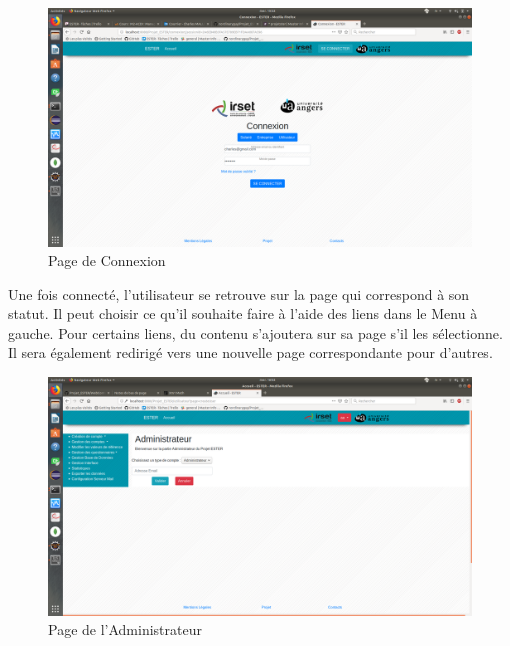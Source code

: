 \begin{figure}[ht]
    \begin{center}
	\includegraphics[scale=0.2,trim=4cm 0cm 4cm 5.3cm, clip=true]{img/Connexion}
    \end{center}
    \caption{Page de Connexion}
\end{figure}

Une fois connecté, l'utilisateur se retrouve sur la page qui correspond à son statut. Il peut choisir ce qu'il souhaite faire à l'aide des liens dans le Menu à gauche. Pour certains liens, du contenu s'ajoutera sur sa page s'il les sélectionne. Il sera également redirigé vers une nouvelle page correspondante pour d'autres. 

\begin{figure}[ht]
    \begin{center}
	\includegraphics[scale=0.2,trim=2.8cm 0.1cm 0.8cm 5.3cm, clip=true]{img/Admin}
    \end{center}
    \caption{Page de l'Administrateur}
\end{figure}

